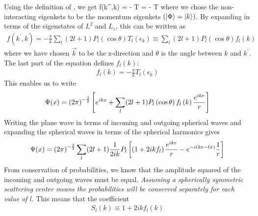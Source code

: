 \documentclass[12pt,twoside]{report}
\numberwithin{equation}{section}
\begin{document}
Using the definition of , we get
\beq
\label{f_in_T}
f(k^\prime,k) = -  T\ket{\Phi} = - T
\eeq
where we chose the non-interacting eigenkets to be the momentum eigenkets \(\left( \ket{\Phi} = \ket{k} \right) \). By expanding in terms of the eigenstates of \(L^2\) and \(L_z\), this can be written as
\begin{equation}\begin{aligned}
	f(k^\prime,k) = - \frac{\pi}{k}\sum_l (2l+1)P_l\left( \cos \theta \right) T_l(\epsilon_k) \equiv \sum_l (2l+1)P_l\left( \cos \theta \right) f_l\left( k \right) 
\end{aligned}\end{equation}
where we have chosen \(\vec k\) to be the z-direction and \(\theta\) is the angle between \(k\) and \(k^\prime\). The last part of the equation defines \(f_l(k)\):
\begin{equation}\begin{aligned}
	f_l(k) = - \frac{\pi}{k} T_l(\epsilon_k)
\end{aligned}\end{equation}
This enables us to write
\begin{equation}\begin{aligned}
	\Psi(x) = \left({2\pi}\right)^{-\frac{3}{2}}\left[{e^{ikx} + \sum_l (2l+1)P_l\left( \cos \theta \right) f_l\left(k\right) \frac{e^{ikr}}{r}}\right]
\end{aligned}\end{equation}
Writing the plane wave in terms of incoming and outgoing spherical waves and expanding the spherical waves in terms of the spherical harmonics gives
\begin{equation}\begin{aligned}
	\Psi(x) = \left({2\pi}\right)^{-\frac{3}{2}}\sum_l (2l+1) \frac{1}{2ik}P_l\left[\left(1 + 2i k f_l \right) \frac{e^{ikr}}{r} - e^{-i\left( kr - l\pi \right) } \frac{1}{r}\right]
\end{aligned}\end{equation}
From conservation of probabilities, we know that the amplitude squared of the incoming and outgoing waves must be equal. \textit{Assuming a spherically symmetric scattering center means the probabilities will be conserved separately for each value of \(l\)}. This means that the coefficient 
\begin{equation}\begin{aligned}
	S_l(k) \equiv 1 + 2i k f_l (k)
\end{aligned}\end{equation}
\end{document}
